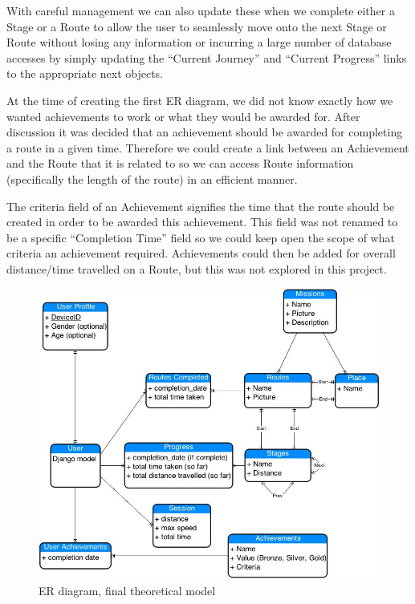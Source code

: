 With careful management we can also update these when we complete
either a Stage or a Route to allow the user to seamlessly move onto
the next Stage or Route without losing any information or incurring a
large number of database accesses by simply updating the ``Current
Journey'' and ``Current Progress'' links to the appropriate next
objects. 

At the time of creating the first ER diagram, we did not know exactly
how we wanted achievements to work or what they would be awarded
for. After discussion it was decided that an achievement should be
awarded for completing a route in a given time. Therefore we could
create a link between an Achievement and the Route that it is related
to so we can access Route information (specifically the length of the
route) in an efficient manner. 

The criteria field of an Achievement signifies the time that the route
should be created in order to be awarded this achievement. This field
was not renamed to be a specific ``Completion Time'' field so we could
keep open the scope of what criteria an achievement
required. Achievements could then be added for overall distance/time
travelled on a Route, but this was not explored in this project.

\begin{figure}[p]
  \centering
  \includegraphics[width=\textwidth]{images/ER.jpg}
  \caption{ER diagram, final theoretical model}
  \label{ER_1}
\end{figure}

